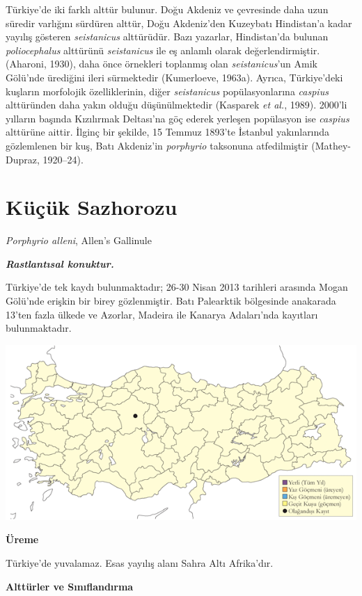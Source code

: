 \documentclass[
  a4paper,
  DIV=11,
  numbers=noendperiod]{scrreprt}
\begin{document}
Türkiye'de iki farklı alttür bulunur. Doğu Akdeniz ve çevresinde daha
uzun süredir varlığını sürdüren alttür, Doğu Akdeniz'den Kuzeybatı
Hindistan'a kadar yayılış gösteren \emph{seistanicus} alttürüdür. Bazı
yazarlar, Hindistan'da bulunan \emph{poliocephalus} alttürünü
\emph{seistanicus} ile eş anlamlı olarak değerlendirmiştir. (Aharoni,
1930), daha önce örnekleri toplanmış olan \emph{seistanicus}'un Amik
Gölü'nde ürediğini ileri sürmektedir (Kumerloeve, 1963a). Ayrıca,
Türkiye'deki kuşların morfolojik özelliklerinin, diğer
\emph{seistanicus} popülasyonlarına \emph{caspius} alttüründen daha
yakın olduğu düşünülmektedir (Kasparek \emph{et al.}, 1989). 2000'li
yılların başında Kızılırmak Deltası'na göç ederek yerleşen popülasyon
ise \emph{caspius} alttürüne aittir. İlginç bir şekilde, 15 Temmuz
1893'te İstanbul yakınlarında gözlemlenen bir kuş, Batı Akdeniz'in
\emph{porphyrio} taksonuna atfedilmiştir (Mathey-Dupraz, 1920--24).

\section{Küçük Sazhorozu}\label{kuxfcuxe7uxfck-sazhorozu}

\emph{Porphyrio alleni}, Allen's Gallinule

\textbf{\emph{Rastlantısal konuktur.}}

Türkiye'de tek kaydı bulunmaktadır; 26-30 Nisan 2013 tarihleri arasında
Mogan Gölü'nde erişkin bir birey gözlenmiştir. Batı Palearktik
bölgesinde anakarada 13'ten fazla ülkede ve Azorlar, Madeira ile Kanarya
Adaları'nda kayıtları bulunmaktadır.

\includegraphics{images/harita_Page_121.png}

\textbf{Üreme}

Türkiye'de yuvalamaz. Esas yayılış alanı Sahra Altı Afrika'dır.

\textbf{Alttürler ve Sınıflandırma}
\end{document}
